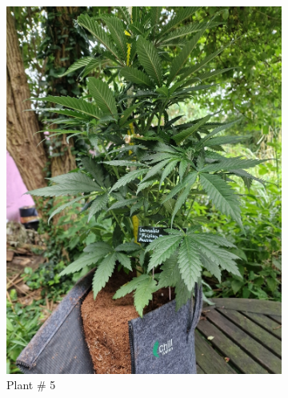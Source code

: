 \begin{figure}[htbp]
\begin{subfigure}[t]{.28\textwidth}
        \includegraphics[width=\linewidth]{plant_05_2024-06-17}
        \caption{Plant \# 5}
        \label{fig:plant_05_2024-06-17}
    \end{subfigure}
    \begin{subfigure}[t]{.28\textwidth}

\end{subfigure}
\end{figure}
